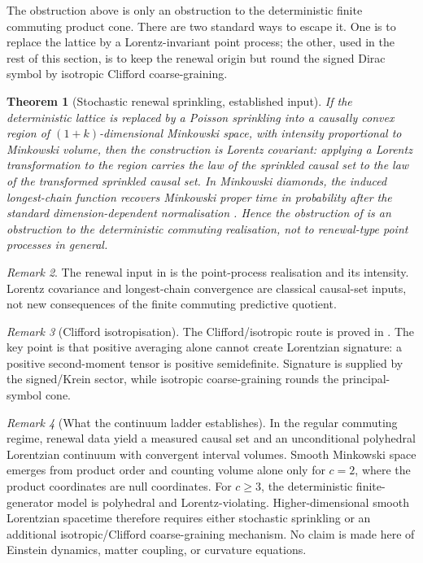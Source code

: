 \documentclass[11pt]{article}
\newtheorem{theorem}{Theorem}[section]
\theoremstyle{definition}
\theoremstyle{remark}
\newtheorem{remark}[theorem]{Remark}
\begin{document}
The obstruction above is only an obstruction to the deterministic finite
commuting product cone.  There are two standard ways to escape it.  One is to
replace the lattice by a Lorentz-invariant point process; the other, used in
the rest of this section, is to keep the renewal origin but round the signed
Dirac symbol by isotropic Clifford coarse-graining.

\begin{theorem}[Stochastic renewal sprinkling, established input]
\label{thm:sprinkling}
If the deterministic lattice is replaced by a Poisson sprinkling into a causally
convex region of $(1+k)$-dimensional Minkowski space, with intensity proportional
to Minkowski volume, then the construction is Lorentz covariant: applying a
Lorentz transformation to the region carries the law of the sprinkled causal set
to the law of the transformed sprinkled causal set.  In Minkowski diamonds, the
induced longest-chain function recovers Minkowski proper time in probability
after the standard dimension-dependent normalisation \cite{Myrheim1978,brightwellgregory1991}.  Hence the obstruction of
 is an obstruction to the deterministic commuting
realisation, not to renewal-type point processes in general.
\end{theorem}

\begin{remark}
The renewal input in  is the point-process realisation and
its intensity.  Lorentz covariance and longest-chain convergence are classical
causal-set inputs, not new consequences of the finite commuting predictive
quotient.
\end{remark}

\begin{remark}[Clifford isotropisation]
\label{rem:rounding-pointer}
The Clifford/isotropic route is proved in .  The key point is that positive averaging alone cannot create Lorentzian signature: a positive second-moment tensor is positive semidefinite.  Signature is supplied by the signed/Krein sector, while isotropic coarse-graining rounds the principal-symbol cone.
\end{remark}

\begin{remark}[What the continuum ladder establishes]
\label{rem:ladder-summary}
In the regular commuting regime, renewal data yield a measured causal set and an unconditional polyhedral Lorentzian continuum with convergent interval volumes.  Smooth Minkowski space emerges from product order and counting volume alone only for $c=2$, where the product coordinates are null coordinates.  For $c\ge3$, the deterministic finite-generator model is polyhedral and Lorentz-violating.  Higher-dimensional smooth Lorentzian spacetime therefore requires either stochastic sprinkling or an additional isotropic/Clifford coarse-graining mechanism.  No claim is made here of Einstein dynamics, matter coupling, or curvature equations.
\end{remark}
\end{document}
